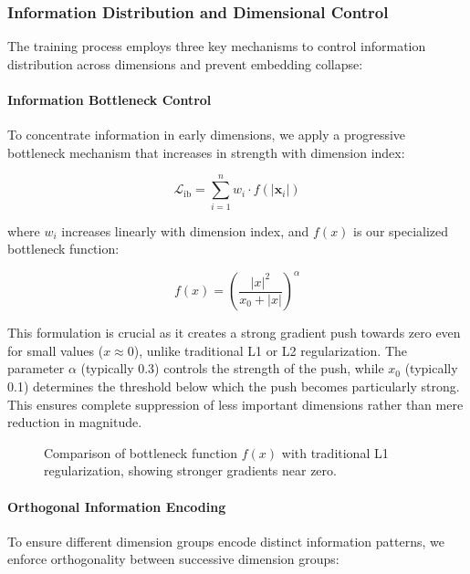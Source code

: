 \subsubsection{Information Distribution and Dimensional Control}
The training process employs three key mechanisms to control information distribution across dimensions and prevent embedding collapse:

\paragraph{Information Bottleneck Control}
To concentrate information in early dimensions, we apply a progressive bottleneck mechanism that increases in strength with dimension index:

\begin{equation}
    \mathcal{L}_{\text{ib}} = \sum_{i=1}^{n} w_i \cdot f(|\mathbf{x}_i|)
\end{equation}

where $w_i$ increases linearly with dimension index, and $f(x)$ is our specialized bottleneck function:

\begin{equation}
    f(x) = \left(\frac{|x|^2}{x_0 + |x|}\right)^\alpha
\end{equation}

This formulation is crucial as it creates a strong gradient push towards zero even for small values ($x \approx 0$), unlike traditional L1 or L2 regularization. The parameter $\alpha$ (typically 0.3) controls the strength of the push, while $x_0$ (typically 0.1) determines the threshold below which the push becomes particularly strong. This ensures complete suppression of less important dimensions rather than mere reduction in magnitude.

\begin{figure}[h]
    \centering
    \caption{Comparison of bottleneck function $f(x)$ with traditional L1 regularization, showing stronger gradients near zero.}
    \label{fig:bottleneck_function}
\end{figure}

\paragraph{Orthogonal Information Encoding}
To ensure different dimension groups encode distinct information patterns, we enforce orthogonality between successive dimension groups:

